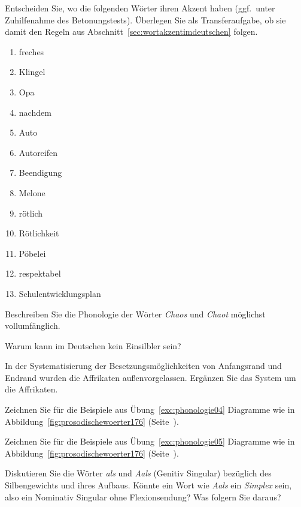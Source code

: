 \label{exc:phonologie05} Entscheiden Sie, wo die folgenden Wörter ihren Akzent haben (ggf.\ unter Zuhilfenahme des Betonungstests).
Überlegen Sie als Transferaufgabe, ob sie damit den Regeln aus Abschnitt~\ref{sec:wortakzentimdeutschen} folgen.

\begin{enumerate}
  \item freches
  \item Klingel
  \item Opa
  \item nachdem
  \item Auto
  \item Autoreifen
  \item Beendigung
  \item Melone
  \item rötlich
  \item Rötlichkeit
  \item Pöbelei
  \item respektabel
  \item Schulentwicklungsplan
\end{enumerate}

\Uebung[\tristar]{} \label{exc:phonologie06} Beschreiben Sie die Phonologie der Wörter \textit{Chaos} und \textit{Chaot} möglichst vollumfänglich.

 \label{exc:phonologie07} Warum kann \textipa{[s5]} im Deutschen kein Einsilbler sein?

\Uebung[\tristar]{} \label{exc:phonologie08} In der Systematisierung der Besetzungsmöglichkeiten von Anfangsrand und Endrand wurden die Affrikaten außenvorgelassen.
Ergänzen Sie das System um die Affrikaten.

\Uebung[\tristar]{} \label{exc:phonologie09} Zeichnen Sie für die Beispiele aus Übung~\ref{exc:phonologie04} Diagramme wie in Abbildung~\ref{fig:prosodischewoerter176} (Seite~\pageref{fig:prosodischewoerter176}).

\Uebung[\tristar]{} \label{exc:phonologie10} Zeichnen Sie für die Beispiele aus Übung~\ref{exc:phonologie05} Diagramme wie in Abbildung~\ref{fig:prosodischewoerter176} (Seite~\pageref{fig:prosodischewoerter176}).

\Uebung[\tristar]{} \label{exc:phonologie11} Diskutieren Sie die Wörter \textit{als} und \textit{Aals} (Genitiv Singular) bezüglich des Silbengewichts und ihres Aufbaus.
Könnte ein Wort wie \textit{Aals} ein \textit{Simplex} sein, also \zB ein Nominativ Singular ohne Flexionsendung?
Was folgern Sie daraus?

